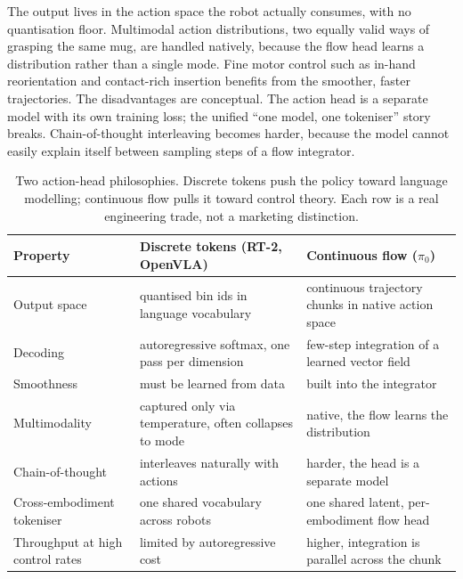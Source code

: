 
 The output lives in the action space the robot actually consumes, with no quantisation floor. Multimodal action distributions, two equally valid ways of grasping the same mug, are handled natively, because the flow head learns a distribution rather than a single mode. Fine motor control such as in-hand reorientation and contact-rich insertion benefits from the smoother, faster trajectories. The disadvantages are conceptual. The action head is a separate model with its own training loss; the unified ``one model, one tokeniser'' story breaks. Chain-of-thought interleaving becomes harder, because the model cannot easily explain itself between sampling steps of a flow integrator.

\begin{table}[ht]
\centering
\begin{tabular}{p{}p{}p{}}
    \toprule
    \textbf{Property} & \textbf{Discrete tokens (RT-2, OpenVLA)} & \textbf{Continuous flow ($\pi_0$)} \\
    \midrule
    Output space & quantised bin ids in language vocabulary & continuous trajectory chunks in native action space \\
    Decoding & autoregressive softmax, one pass per dimension & few-step integration of a learned vector field \\
    Smoothness & must be learned from data & built into the integrator \\
    Multimodality & captured only via temperature, often collapses to mode & native, the flow learns the distribution \\
    Chain-of-thought & interleaves naturally with actions & harder, the head is a separate model \\
    Cross-embodiment tokeniser & one shared vocabulary across robots & one shared latent, per-embodiment flow head \\
    Throughput at high control rates & limited by autoregressive cost & higher, integration is parallel across the chunk \\
    \bottomrule
\end{tabular}
\vspace{2em}
\caption{Two action-head philosophies. Discrete tokens push the policy toward language modelling; continuous flow pulls it toward control theory. Each row is a real engineering trade, not a marketing distinction.}
\label{tab:action_heads}
\end{table}

